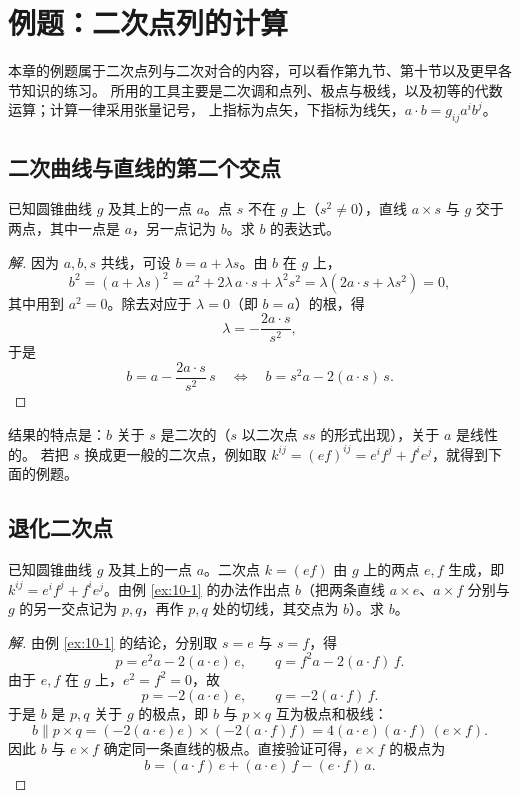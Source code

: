 \chapter{例题：二次点列的计算}

本章的例题属于二次点列与二次对合的内容，可以看作第九节、第十节以及更早各节知识的练习。
所用的工具主要是二次调和点列、极点与极线，以及初等的代数运算；计算一律采用张量记号，
上指标为点矢，下指标为线矢，$a\cdot b=g_{ij}a^ib^j$。

\section{二次曲线与直线的第二个交点}

\begin{example}\label{ex:10-1}
已知圆锥曲线 $g$ 及其上的一点 $a$。点 $s$ 不在 $g$ 上（$s^2\neq0$），直线 $a\times s$ 与 $g$
交于两点，其中一点是 $a$，另一点记为 $b$。求 $b$ 的表达式。
\end{example}

\begin{proof}[解]
因为 $a,b,s$ 共线，可设 $b=a+\lambda s$。由 $b$ 在 $g$ 上，
\[
b^2=(a+\lambda s)^2=a^2+2\lambda\,a\cdot s+\lambda^2s^2
=\lambda\left(2a\cdot s+\lambda s^2\right)=0,
\]
其中用到 $a^2=0$。除去对应于 $\lambda=0$（即 $b=a$）的根，得
\[
\lambda=-\frac{2a\cdot s}{s^2},
\]
于是
\[
b=a-\frac{2a\cdot s}{s^2}\,s
\quad\Longleftrightarrow\quad
b=s^2a-2(a\cdot s)\,s .
\]
\end{proof}

结果的特点是：$b$ 关于 $s$ 是二次的（$s$ 以二次点 $ss$ 的形式出现），关于 $a$ 是线性的。
若把 $s$ 换成更一般的二次点，例如取 $k^{ij}=(ef)^{ij}=e^if^j+f^ie^j$，就得到下面的例题。

\section{退化二次点}

\begin{example}\label{ex:10-2}
已知圆锥曲线 $g$ 及其上的一点 $a$。二次点 $k=(ef)$ 由 $g$ 上的两点 $e,f$ 生成，即
$k^{ij}=e^if^j+f^ie^j$。由例 \ref{ex:10-1} 的办法作出点 $b$（把两条直线 $a\times e$、$a\times f$
分别与 $g$ 的另一交点记为 $p,q$，再作 $p,q$ 处的切线，其交点为 $b$）。求 $b$。
\end{example}

\begin{proof}[解]
由例 \ref{ex:10-1} 的结论，分别取 $s=e$ 与 $s=f$，得
\[
p=e^2a-2(a\cdot e)\,e,\qquad q=f^2a-2(a\cdot f)\,f .
\]
由于 $e,f$ 在 $g$ 上，$e^2=f^2=0$，故
\[
p=-2(a\cdot e)\,e,\qquad q=-2(a\cdot f)\,f .
\]
于是 $b$ 是 $p,q$ 关于 $g$ 的极点，即 $b$ 与 $p\times q$ 互为极点和极线：
\[
b\parallel p\times q
=\left(-2(a\cdot e)e\right)\times\left(-2(a\cdot f)f\right)
=4(a\cdot e)(a\cdot f)\,(e\times f).
\]
因此 $b$ 与 $e\times f$ 确定同一条直线的极点。直接验证可得，$e\times f$ 的极点为
\[
b=(a\cdot f)\,e+(a\cdot e)\,f-(e\cdot f)\,a .
\]
\end{proof}

